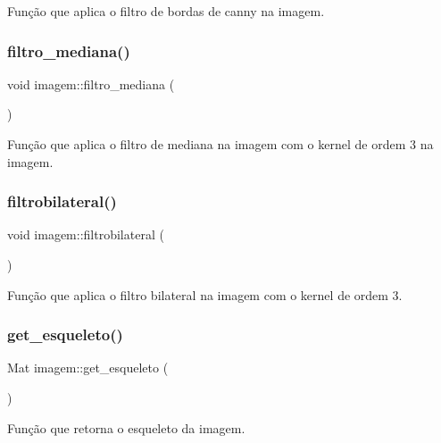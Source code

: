 Função que aplica o filtro de bordas de canny na imagem. 

\mbox{\label{classimagem_a58e307bbc753f8c5fb9ba3d434a30617}} 
\subsubsection{\texorpdfstring{filtro\+\_\+mediana()}{filtro\_mediana()}}
{\footnotesize\ttfamily void imagem\+::filtro\+\_\+mediana (\begin{DoxyParamCaption}{ }\end{DoxyParamCaption})}



Função que aplica o filtro de mediana na imagem com o kernel de ordem 3 na imagem. 

\mbox{\label{classimagem_ac17d8fd15a1929bab5db225542dd71a6}} 
\subsubsection{\texorpdfstring{filtrobilateral()}{filtrobilateral()}}
{\footnotesize\ttfamily void imagem\+::filtrobilateral (\begin{DoxyParamCaption}{ }\end{DoxyParamCaption})}



Função que aplica o filtro bilateral na imagem com o kernel de ordem 3. 

\mbox{\label{classimagem_a68615db6ed7ab0639ba5bc0c77e9552e}} 
\subsubsection{\texorpdfstring{get\+\_\+esqueleto()}{get\_esqueleto()}}
{\footnotesize\ttfamily Mat imagem\+::get\+\_\+esqueleto (\begin{DoxyParamCaption}{ }\end{DoxyParamCaption})}



Função que retorna o esqueleto da imagem. 

